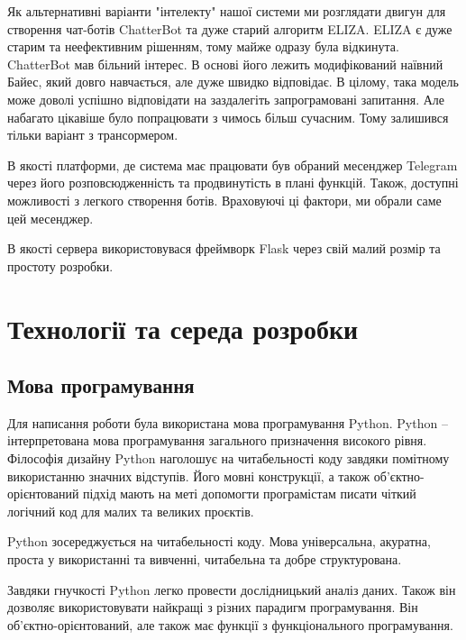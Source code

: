 \documentclass[a4paper,14pt]{extreport}
\begin{document}
    Як альтернативні варіанти "інтелекту" нашої системи ми розглядати двигун для створення чат-ботів ChatterBot та дуже старий алгоритм ELIZA. ELIZA є дуже старим та неефективним рішенням, тому майже одразу була відкинута. ChatterBot мав більний інтерес. В основі його лежить модифікований наївний Байес, який довго навчається, але дуже швидко відповідає. В цілому, така модель може доволі успішно відповідати на заздалегіть запрограмовані запитання. Але набагато цікавіше було попрацювати з чимось більш сучасним. Тому залишився тільки варіант з трансормером.

    В якості платформи, де система має працювати був обраний месенджер Telegram через його розповсюдженність та продвинутість в плані функцій. Також, доступні можливості з легкого створення ботів. Враховуючі ці фактори, ми обрали саме цей месенджер.

    В якості сервера використовувася фреймворк Flask через свій малий розмір та простоту розробки.

\section{Технології та середа розробки}
    \subsection{Мова програмування}
        Для написання роботи була використана мова програмування Python. Python -- інтерпретована мова програмування загального призначення високого рівня. Філософія дизайну Python наголошує на читабельності коду завдяки помітному використанню значних відступів. Його мовні конструкції, а також об’єктно-орієнтований підхід мають на меті допомогти програмістам писати чіткий логічний код для малих та великих проєктів.

        Python зосереджується на читабельності коду. Мова універсальна, акуратна, проста у використанні та вивченні, читабельна та добре структурована.

        Завдяки гнучкості Python легко провести дослідницький аналіз даних. Також він дозволяє використовувати найкращі з різних парадигм програмування. Він об’єктно-орієнтований, але також має функції з функціонального програмування.
\end{document}
